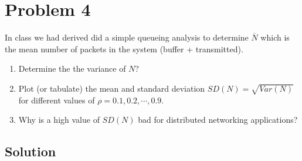 
\section*{Problem 4}

In class we had derived did a simple queueing analysis to determine $\overline{N}$ which is the mean number of packets
in the system (buffer + transmitted).

\begin{enumerate}
    \item Determine the the variance of $N$?
    \item Plot (or tabulate) the mean and standard deviation $SD(N) = \sqrt{Var(N)}$ for different values of $\rho = 0.1, 0.2, \cdots , 0.9$.
    \item Why is a high value of $SD(N)$ bad for distributed networking applications?
\end{enumerate}

\subsection*{Solution}

